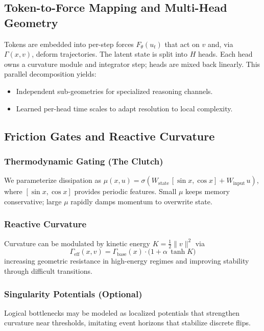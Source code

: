\documentclass{article}
\numberwithin{equation}{section}
\begin{document}
\subsection{Token-to-Force Mapping and Multi-Head Geometry}
Tokens are embedded into per-step forces $F_\theta(u_t)$ that act on $v$ and, via $\Gamma(x,v)$, deform trajectories. The latent state is split into $H$ heads. Each head owns a curvature module and integrator step; heads are mixed back linearly. This parallel decomposition yields:
\begin{itemize}
\item Independent sub-geometries for specialized reasoning channels.
\item Learned per-head time scales to adapt resolution to local complexity.
\end{itemize}

\subsection{Friction Gates and Reactive Curvature}
\subsubsection{Thermodynamic Gating (The Clutch)}
We parameterize dissipation as $\mu(x,u) = \sigma(W_{\text{state}}\,[\sin x,\cos x] + W_{\text{input}}\,u)$, where $[\sin x,\cos x]$ provides periodic features. Small $\mu$ keeps memory conservative; large $\mu$ rapidly damps momentum to overwrite state.

\subsubsection{Reactive Curvature}
Curvature can be modulated by kinetic energy $K=\tfrac12\|v\|^2$ via
\[
\Gamma_{\text{eff}}(x,v) = \Gamma_{\text{base}}(x) \cdot \big(1 + \alpha\,\tanh K\big)
\]
increasing geometric resistance in high-energy regimes and improving stability through difficult transitions.

\subsubsection{Singularity Potentials (Optional)}
Logical bottlenecks may be modeled as localized potentials that strengthen curvature near thresholds, imitating event horizons that stabilize discrete flips.
\end{document}
